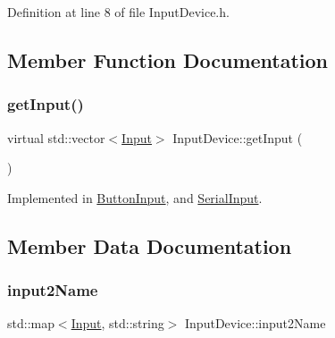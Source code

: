 Definition at line 8 of file Input\+Device.\+h.



\subsection{Member Function Documentation}
\mbox{\label{class_input_device_a946ae438b3a044741614493000aa216f}} 
\subsubsection{\texorpdfstring{get\+Input()}{getInput()}}
{\footnotesize\ttfamily virtual std\+::vector$<$\hyperlink{class_input_device_a75152d8f06b6d032036014e42e44688b}{Input}$>$ Input\+Device\+::get\+Input (\begin{DoxyParamCaption}{ }\end{DoxyParamCaption})\hspace{0.3cm}{\ttfamily [pure virtual]}}



Implemented in \hyperlink{class_button_input_ab893731e65a4de626ad729cb9582da96}{Button\+Input}, and \hyperlink{class_serial_input_af7b4f4d7d059119c5e388a9747d25002}{Serial\+Input}.



\subsection{Member Data Documentation}
\mbox{\label{class_input_device_a00a8bfc566bbed9a7bae53cacdf82715}} 
\subsubsection{\texorpdfstring{input2\+Name}{input2Name}}
{\footnotesize\ttfamily std\+::map$<$\hyperlink{class_input_device_a75152d8f06b6d032036014e42e44688b}{Input}, std\+::string$>$ Input\+Device\+::input2\+Name}

